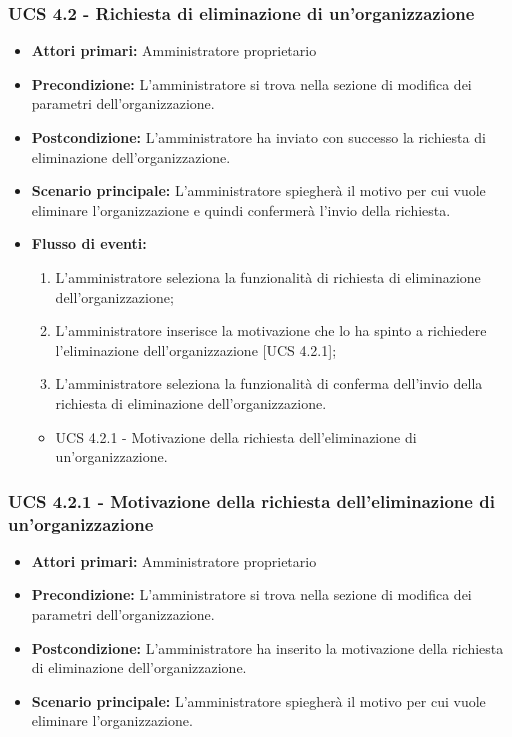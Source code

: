 \subsubsection{UCS 4.2 - Richiesta di eliminazione di un'organizzazione}%
\begin{itemize}
\item \textbf{Attori primari:} Amministratore proprietario
\item \textbf{Precondizione:} L'amministratore si trova nella sezione di modifica dei parametri dell'organizzazione.
\item \textbf{Postcondizione:} L'amministratore ha inviato con successo la richiesta di eliminazione dell'organizzazione.
\item \textbf{Scenario principale:} L'amministratore spiegherà il motivo per cui vuole eliminare l'organizzazione e quindi confermerà l'invio della richiesta.
\item \textbf{Flusso di eventi:}
\begin{enumerate}
    \item L'amministratore seleziona la funzionalità di richiesta di eliminazione dell'organizzazione;
    \item L'amministratore inserisce la motivazione che lo ha spinto a richiedere l'eliminazione dell'organizzazione [UCS 4.2.1];
    \item L'amministratore seleziona la funzionalità di conferma dell'invio della richiesta di eliminazione dell'organizzazione.
\end{enumerate}
\begin{itemize}
    \item UCS 4.2.1 - Motivazione della richiesta dell'eliminazione di un'organizzazione.
\end{itemize}
\end{itemize}

\subsubsection{UCS 4.2.1 - Motivazione della richiesta dell'eliminazione di un'organizzazione}%
\begin{itemize}
\item \textbf{Attori primari:} Amministratore proprietario
\item \textbf{Precondizione:} L'amministratore si trova nella sezione di modifica dei parametri dell'organizzazione.
\item \textbf{Postcondizione:} L'amministratore ha inserito la motivazione della richiesta di eliminazione dell'organizzazione.
\item \textbf{Scenario principale:} L'amministratore spiegherà il motivo per cui vuole eliminare l'organizzazione.
\end{itemize}

